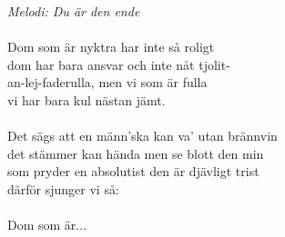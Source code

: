 {\footnotesize\textit{Melodi: Du är den ende}}\\
\\
Dom som är nyktra har inte så roligt\\
dom har bara ansvar och inte nåt tjolit-\\
an-lej-faderulla, men vi som är fulla\\
vi har bara kul nästan jämt.\\
\\
Det sägs att en männ'ska kan va' utan brännvin\\
det stämmer kan hända men se blott den min\\
som pryder en absolutist den är djävligt trist\\
därför sjunger vi så:\\
\\
Dom som är...
